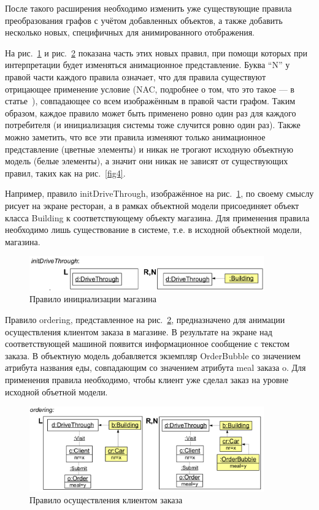\documentclass[a5paper]{article}
\begin{document}
После такого расширения необходимо изменить уже существующие правила преобразования графов с учётом добавленных объектов, а также добавить несколько новых, специфичных для анимированного отображения.

На рис.~\ref{fig6a} и рис.~\ref{fig6b} показана часть этих новых правил, при помощи которых при интерпретации будет изменяться анимационное представление. Буква “N” у правой части каждого правила означает, что для правила существуют отрицающее применение условие (NAC, подробнее о том, что это такое --- в статье~\cite{part1}), совпадающее со всем изображённым в правой части графом. Таким образом, каждое правило может быть применено ровно один раз для каждого потребителя (и инициализация системы тоже случится ровно один раз). Также можно заметить, что все эти правила изменяют только анимационное представление (цветные элементы) и никак не трогают исходную объектную модель (белые элементы), а значит они никак не зависят от существующих правил, таких как на рис.~\ref{fig4}.

Например, правило initDriveThrough, изображённое на рис.~\ref{fig6a}, по своему смыслу рисует на экране ресторан, а в рамках объектной модели присоединяет объект класса Building к соответствующему объекту магазина. Для применения правила необходимо лишь существование в системе, т.е. в исходной объектной модели, магазина.

\begin{figure} [ht]
  \begin{center}
    \includegraphics[width=0.9\textwidth]{6a.png}
    \caption{Правило инициализации магазина}
    \label{fig6a}
  \end{center}
\end{figure}

Правило ordering, представленное на рис.~\ref{fig6b}, предназначено для анимации осуществления клиентом заказа в магазине. В результате на экране над соответствующей машиной появится информационное сообщение с текстом заказа. В объектную модель добавляется экземпляр OrderBubble со значением атрибута названия еды, совпадающим со значением атрибута meal заказа o. Для применения правила необходимо, чтобы клиент уже сделал заказ на уровне исходной объетной модели.

\begin{figure} [ht]
  \begin{center}
    \includegraphics[width=0.9\textwidth]{6b.png}
    \caption{Правило осуществления клиентом заказа}
    \label{fig6b}
  \end{center}
\end{figure}
\end{document}
